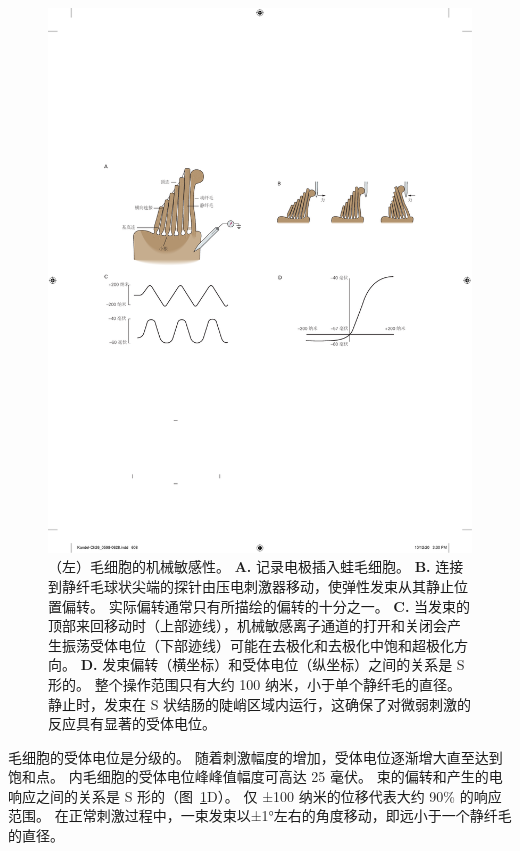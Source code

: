 \begin{figure}[htbp]
	\centering
	\includegraphics[width=1.0\linewidth]{chap26/fig_26_7}
	\caption{（左）毛细胞的机械敏感性。
		\textbf{A.} 记录电极插入蛙毛细胞。
		\textbf{B.} 连接到静纤毛球状尖端的探针由压电刺激器移动，使弹性发束从其静止位置偏转。
		实际偏转通常只有所描绘的偏转的十分之一。
		\textbf{C.} 当发束的顶部来回移动时（上部迹线），机械敏感离子通道的打开和关闭会产生振荡受体电位（下部迹线）可能在去极化和去极化中饱和超极化方向。
		\textbf{D.} 发束偏转（横坐标）和受体电位（纵坐标）之间的关系是 S 形的。
		整个操作范围只有大约 100 纳米，小于单个静纤毛的直径。
		静止时，发束在 S 状结肠的陡峭区域内运行，这确保了对微弱刺激的反应具有显著的受体电位。}
	\label{fig:26_7}
\end{figure}


毛细胞的受体电位是分级的。
随着刺激幅度的增加，受体电位逐渐增大直至达到饱和点。
内毛细胞的受体电位峰峰值幅度可高达 25 毫伏。
束的偏转和产生的电响应之间的关系是 S 形的（图~\ref{fig:26_7}D）。
仅 ±100 纳米的位移代表大约 90\% 的响应范围。
在正常刺激过程中，一束发束以±1°左右的角度移动，即远小于一个静纤毛的直径。


